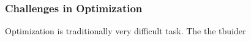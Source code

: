 \subsubsection{Challenges in Optimization}

Optimization is traditionally very difficult task. The the tbuider 